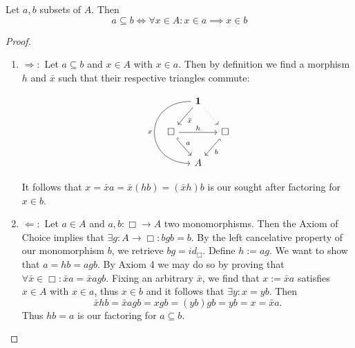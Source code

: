 \begin{theorem}
Let $a, b$ subsets of $A$. Then
\begin{equation}
a \subseteq b \iff \forall x \in A: x \in a \implies x \in b
\end{equation}
\end{theorem}

\begin{proof}
\begin{enumerate} 
\item $\Rightarrow :$ Let $a \subseteq b$ and $x \in A$ with $x \in a$. Then by definition we find a morphism $h$ and $\bar{x}$ such that their respective triangles commute:

\begin{equation}
\begin{tikzcd}[column sep=small]
& \mathbf{1} \arrow[dl, "\bar{x}"] \arrow[dr, dotted] \arrow[dd, "x", bend right=90,looseness=2,swap]& \\
\Box \arrow[rr, "h"] \arrow[dr, "a", hook] &     & \Box \arrow[dl, "b", hook] \\
& A
\end{tikzcd}
\end{equation} \newline

It follows that $x = \bar{x}a = \bar{x}(hb) = (\bar{x}h)b$ is our sought after factoring for $x \in b$.

\item $\Leftarrow :$ Let $a \in A$ and $a,b: \Box \longrightarrow A$ two monomorphisms. Then the Axiom of Choice implies that $\exists g: A \longrightarrow \Box : bgb = b$. By the left cancelative property of our monomorphism $b$, we retrieve $bg = id_\Box$. Define $h := ag$. We want to show that $a = hb = agb$. By Axiom 4 we may do so by proving that $\forall \bar{x} \in \Box: \bar{x}a = \bar{x}agb$. Fixing an arbitrary $\bar{x}$, we find that $x := \bar{x}a$ satisfies $x \in A$ with $x \in a$, thus $x \in b$ and it follows that $\exists y : x = yb$. Then
\begin{equation*}
\bar{x}hb = \bar{x}agb = xgb = (yb)gb = yb = x = \bar{x}a.
\end{equation*}
Thus $hb = a$ is our factoring for $a \subseteq b$. 
\end{enumerate}
\end{proof}





\clearpage


